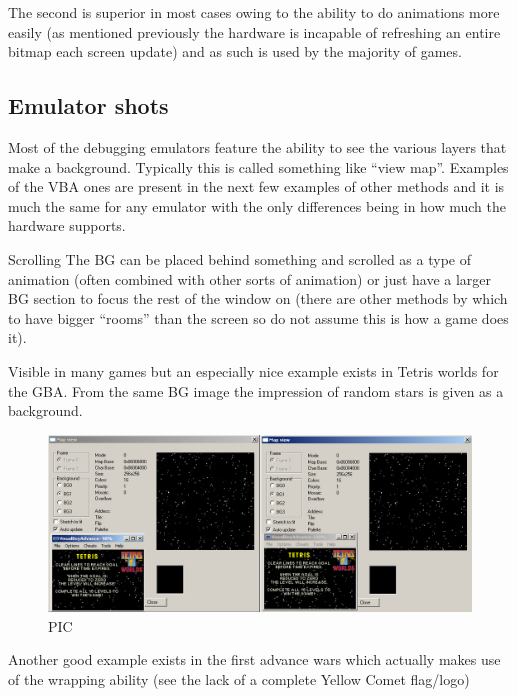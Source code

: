 \documentclass[
]{book}
\begin{document}
The second is superior in most cases owing to the ability to do animations more easily (as mentioned previously the hardware is incapable of refreshing an entire bitmap each screen update) and as such is used by the majority of games.

\hypertarget{emulator-shots}{%
\subsection{Emulator shots}\label{emulator-shots}}

Most of the debugging emulators feature the ability to see the various layers that make a background. Typically this is called something like ``view map''. Examples of the VBA ones are present in the next few examples of other methods and it is much the same for any emulator with the only differences being in how much the hardware supports.

Scrolling The BG can be placed behind something and scrolled as a type of animation (often combined with other sorts of animation) or just have a larger BG section to focus the rest of the window on (there are other methods by which to have bigger ``rooms'' than the screen so do not assume this is how a game does it).

Visible in many games but an especially nice example exists in Tetris worlds for the GBA. From the same BG image the impression of random stars is given as a background.

\begin{figure}
\centering
\includegraphics{images/35_home_fast6191_romhackingguide_unrenamed_file___inal_borders_romhackingguide2dBGscrolling_1.png}
\caption{PIC}
\end{figure}

Another good example exists in the first advance wars which actually makes use of the wrapping ability (see the lack of a complete Yellow Comet flag/logo)
\end{document}
